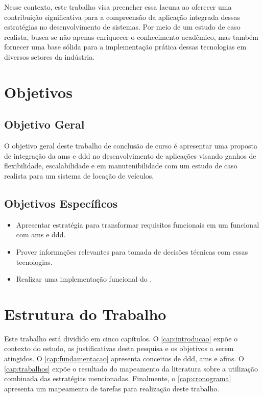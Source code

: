 Nesse contexto, este trabalho visa preencher essa lacuna ao oferecer uma contribuição significativa para a compreensão da aplicação integrada dessas estratégias no desenvolvimento de sistemas. Por meio de um estudo de caso realista, busca-se não apenas enriquecer o conhecimento acadêmico, mas também fornecer uma base sólida para a implementação prática dessas tecnologias em diversos setores da indústria.

\section{Objetivos}

\subsection{Objetivo Geral}
O objetivo geral deste trabalho de conclusão de curso é apresentar uma proposta de integração da \acrlong{ams} e \acrlong{ddd} no desenvolvimento de aplicações visando ganhos de flexibilidade, escalabilidade e em manutenibilidade com um estudo de caso realista para um sistema de locação de veículos.

\subsection{Objetivos Específicos}
\begin{itemize}
\item Apresentar estratégia para transformar requisitos funcionais em um  funcional com \acrshort{ams} e \acrshort{ddd}.
\item Prover informações relevantes para tomada de decisões técnicas com essas tecnologias.
\item Realizar uma implementação funcional do .
\end{itemize}

\section{Estrutura do Trabalho}

Este trabalho está dividido em cinco capítulos.  O \autoref{cap:introducao} expõe o contexto do estudo, as justificativas desta pesquisa e os objetivos a serem atingidos. O \autoref{cap:fundamentacao} apresenta conceitos de \acrshort{ddd}, \acrshort{ams} e afins. O \autoref{cap:trabalhos} expõe o resultado do mapeamento da literatura sobre a utilização combinada das estratégias mencionadas. Finalmente, o \autoref{cap:cronograma} apresenta um mapeamento de tarefas para realização deste trabalho.